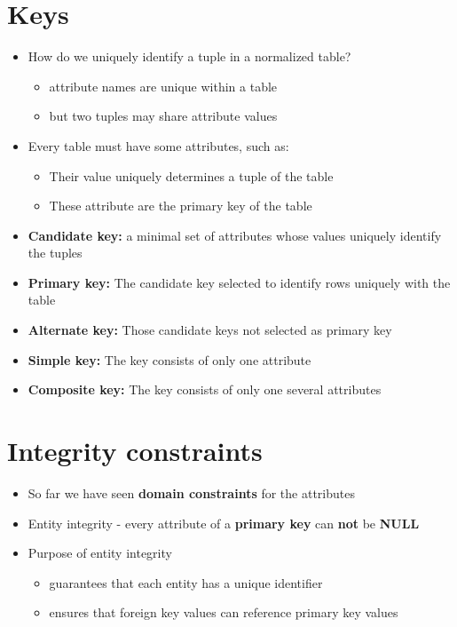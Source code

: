 \documentclass{article}[18pt]
\begin{document}
\section{Keys}
\begin{itemize}
	\item How do we uniquely identify a tuple in a normalized table?
	\begin{itemize}
		\item attribute names are unique within a table
		\item but two tuples may share attribute values
	\end{itemize}
	\item Every table must have some attributes, such as:
	\begin{itemize}
		\item Their value uniquely determines a tuple of the table
		\item These attribute are the primary key of the table
	\end{itemize}
\end{itemize}
\begin{itemize}
	\item \textbf{Candidate key:} a minimal set of attributes whose values uniquely identify the tuples
	\item \textbf{Primary key:} The candidate key selected to identify rows uniquely with the table
	\item \textbf{Alternate key:} Those candidate keys not selected as primary key
	\item \textbf{Simple key:} The key consists of only one attribute
	\item \textbf{Composite key:} The key consists of only one several attributes
\end{itemize}
\section{Integrity constraints}
\begin{itemize}
\item So far we have seen \textbf{domain constraints} for the attributes
\item Entity integrity - every attribute of a \textbf{primary key} can \textbf{not} be \textbf{NULL}
\item Purpose of entity integrity
\begin{itemize}
	\item guarantees that each entity has a unique identifier
	\item ensures that foreign key values can reference primary key values
\end{itemize}
\end{itemize}
\end{document}
